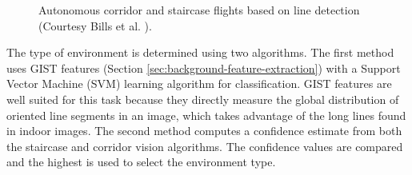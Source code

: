 \begin{figure}[htb!]
  \begin{center}
\hspace{1cm}
   
  \end{center}
  \caption{Autonomous corridor and staircase flights based on line detection (Courtesy Bills et al. \cite{Bills2011icra}).}
  \label{featureImg}
\end{figure}

The type of environment is determined using two algorithms.
The first method uses GIST features \cite{oliva2001modeling} (Section \ref{sec:background-feature-extraction}) with a Support Vector Machine (SVM) learning algorithm for classification.
GIST features are well suited for this task because they directly measure the global distribution of oriented line segments in an image, which takes advantage of the long lines found in indoor images.
The second method computes a confidence estimate from both the staircase and corridor vision algorithms.
The confidence values are compared and the highest is used to select the environment type.


